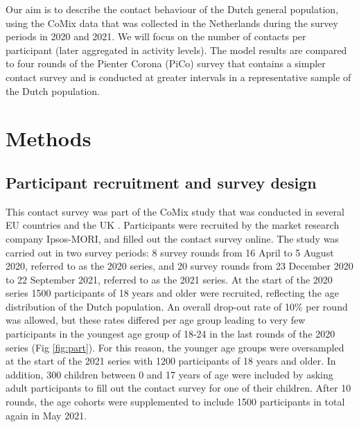 \documentclass[fleqn,10pt]{wlscirep}
\begin{document}
Our aim is to describe the contact behaviour of the Dutch general population, using the CoMix data that was collected in the Netherlands during the survey periods in 2020 and 2021. We will focus on the number of contacts per participant (later aggregated in activity levels). The model results are compared to four rounds of the Pienter Corona (PiCo) survey \cite{Vos_2021, Backer_2021} that contains a simpler contact survey and is conducted at greater intervals in a representative sample of the Dutch population.




\section*{Methods}

\subsection*{Participant recruitment and survey design}

This contact survey was part of the CoMix study that was conducted in several EU countries and the UK \cite{Verelst_2021}. Participants were recruited by the market research company Ipsos-MORI, and filled out the contact survey online. The study was carried out in two survey periods: 8 survey rounds from 16 April to 5 August 2020, referred to as the 2020 series, and 20 survey rounds from 23 December 2020 to 22 September 2021, referred to as the 2021 series. At the start of the 2020 series 1500 participants of 18 years and older were recruited, reflecting the age distribution of the Dutch population. An overall drop-out rate of 10\% per round was allowed, but these rates differed per age group leading to very few participants in the youngest age group of 18-24 in the last rounds of the 2020 series (Fig \ref{fig:part}). For this reason, the younger age groups were oversampled at the start of the 2021 series with 1200 participants of 18 years and older. In addition, 300 children between 0 and 17 years of age were included by asking adult participants to fill out the contact survey for one of their children. After 10 rounds, the age cohorts were supplemented to include 1500 participants in total again in May 2021.
\end{document}
